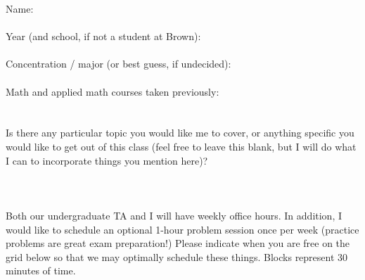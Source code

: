\documentclass[11pt]{article}
\begin{document}
Name:
\\\\
Year (and school, if not a student at Brown):
\\\\
Concentration / major (or best guess, if undecided):
\\\\
Math and applied math courses taken previously:
\\\\\\

Is there any particular topic you would like me to cover, or anything specific you would like to get out of this class (feel free to leave this blank, but I will do what I can to incorporate things you mention here)?
\\\\\\\\
Both our undergraduate TA and I will have weekly office hours. In addition, I would like to schedule an optional 1-hour problem session once per week (practice problems are great exam preparation!) Please indicate when you are free on the grid below so that we may optimally schedule these things. Blocks represent 30 minutes of time.
\end{document}
